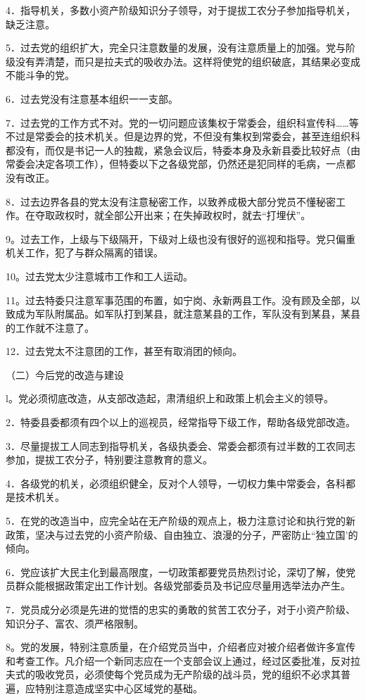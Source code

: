 4．指导机关，多数小资产阶级知识分子领导，对于提拔工农分子参加指导机关，缺乏注意。

5．过去党的组织扩大，完全只注意数量的发展，没有注意质量上的加强。党与阶级没有弄清楚，而只是拉夫式的吸收办法。这样将使党的组织破底，其结果必变成不能斗争的党。

6．过去党没有注意基本组织一一支部。

7．过去党的工作方式不对。党的一切问题应该集权于常委会，组织科宣传科……等不过是常委会的技术机关。但是边界的党，不但没有集权到常委会，甚至连组织科都没有，而仅是书记一人的独裁，紧急会议后，特委本身及永新县委比较好点（由常委会决定各项工作），但特委以下之各级党部，仍然还是犯同样的毛病，一点都没有改正。

8．过去边界各县的党太没有注意秘密工作，以致养成极大部分党员不懂秘密工作。在夺取政权时，就全部公开出来；在失掉政权时，就去“打埋伏”。

9。过去工作，上级与下级隔开，下级对上级也没有很好的巡视和指导。党只偏重机关工作，犯了与群众隔离的错误。

10。过去党太少注意城市工作和工人运动。

11。过去特委只注意军事范围的布置，如宁岗、永新两县工作。没有顾及全部，以致成为军队附属品。如军队打到某县，就注意某县的工作，军队没有到某县，某县的工作就不注意了。

12．过去党太不注意团的工作，甚至有取消团的倾向。

（二）今后党的改造与建设

l。党必须彻底改造，从支部改造起，肃清组织上和政策上机会主义的领导。

2．特委县委都须有四个以上的巡视员，经常指导下级工作，帮助各级党部改造。

3．尽量提拔工人同志到指导机关，各级执委会、常委会都须有过半数的工农同志参加，提拔工农分子，特别要注意教育的意义。

4．各级党的机关，必须组织健全，反对个人领导，一切权力集中常委会，各科都是技术机关。

5．在党的改造当中，应完全站在无产阶级的观点上，极力注意讨论和执行党的新政策，坚决与过去党的小资产阶级、自由独立、浪漫的分子，严密防止“独立国’的倾向。

6．党应该扩大民主化到最高限度，一切政策都要党员热烈讨论，深切了解，使党员群众能根据政策定出工作计划。各级党部委员及书记应尽量用选举法办产生。

7．党员成分必须是先进的觉悟的忠实的勇敢的贫苦工农分子，对于小资产阶级、知识分子、富农、须严格限制。

8。党的发展，特别注意质量，在介绍党员当中，介绍者应对被介绍者做许多宣传和考查工作。凡介绍一个新同志应在一个支部会议上通过，经过区委批准，反对拉夫式的吸收党员，必须使每个党员成为无产阶级的战斗员，党的组织不必求其普遍，应特别注意造成坚实中心区域党的基础。

